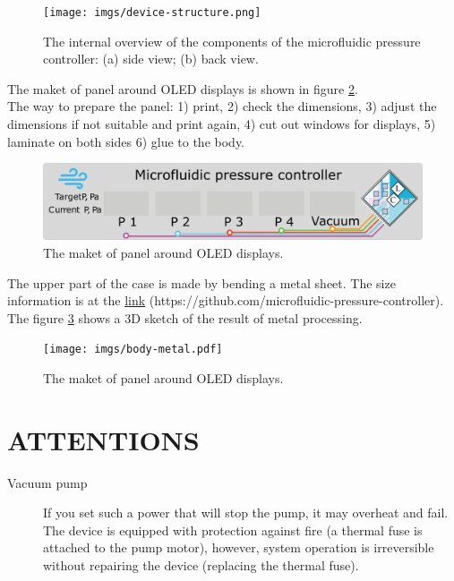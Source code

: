 \documentclass[twoside, 12pt, a4paper]{refart}
\begin{document}
    \begin{figure}[H]
	  \begin{center}
	  \texttt{[image: imgs/device-structure.png]}
	  \caption{The internal overview of the components of the microfluidic pressure controller: (a) side view; (b) back view.}
	  \label{fig:device-structure}
	  \end{center}
    \end{figure}
   
    \newpage
    The maket of panel around OLED displays is shown in figure \ref{fig:panel-template}.\\
    The way to prepare the panel: 1) print, 2) check the dimensions, 3) adjust the dimensions if not suitable and print again, 4) cut out windows for displays, 5) laminate on both sides 6) glue to the body.
    \begin{figure}[H]
	  \begin{center}
	  \includegraphics[width=\textwidth]{imgs/panel-template.png}
	  \caption{The maket of panel around OLED displays.}
	  \label{fig:panel-template}
	  \end{center}
    \end{figure}

    The upper part of the case is made by bending a metal sheet. The size information is at the \href{https://github.com/microfluidic-pressure-controller}{link} (https://github.com/microfluidic-pressure-controller).\\
The figure \ref{fig:bodymetal} shows a 3D sketch of the result of metal processing.
    \begin{figure}[H]
	  \begin{center}
	  \texttt{[image: imgs/body-metal.pdf]}
	  \caption{The maket of panel around OLED displays.}
	  \label{fig:bodymetal}
	  \end{center}
    \end{figure}

 
  
  
  \newpage
  \section{ATTENTIONS}
    \begin{description}  
    \item[Vacuum pump]
      If you set such a power that will stop the pump, it may overheat and fail. The device is equipped with protection against fire (a thermal fuse is attached to the pump motor), however, system operation is irreversible without repairing the device (replacing the thermal fuse).
    \end{description} 




\printindex
\end{document}
